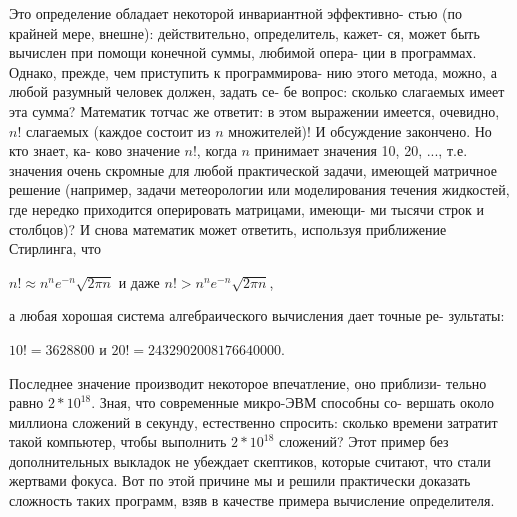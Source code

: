 Это определение  обладает  некоторой  инвариантной  эффективно-\linebreak
стью (по крайней мере, внешне): действительно, определитель, кажет-\linebreak
ся, может быть вычислен при помощи конечной суммы, любимой опера-\linebreak
ции в программах. Однако, прежде, чем приступить к программирова-\linebreak
нию этого метода, можно, а любой разумный человек должен, задать се-\linebreak
бе вопрос: сколько слагаемых имеет эта сумма? Математик тотчас же\linebreak
\newpage
\noindent
ответит: в этом выражении имеется, очевидно, $n!$ слагаемых (каждое\linebreak
состоит из $n$ множителей)! И обсуждение закончено. Но кто знает, ка-\linebreak
ково значение $n!$, когда $n$ принимает значения  10, 20, ..., т.е. значения\linebreak
очень скромные для любой  практической задачи,  имеющей матричное\linebreak
решение  (например,  задачи  метеорологии  или  моделирования течения\linebreak
жидкостей, где нередко приходится оперировать матрицами, имеющи-\linebreak
ми  тысячи  строк  и  столбцов)?  И  снова  математик  может  ответить,\linebreak
используя приближение Стирлинга, что
\begin{center}
$n!\approx n^ne^{-n}\sqrt{2\pi n}$ и даже $n!>n^ne^{-n}\sqrt{2\pi n}$,
\end{center}
а любая хорошая система алгебраического вычисления дает точные ре-\linebreak
зультаты:
\begin{center}
$10!=3 628 800$ и $20!=2 432 902 008 176 640 000$.
\end{center}
Последнее значение производит некоторое впечатление, оно приблизи­-\linebreak
тельно равно $2*10^{18}$. Зная, что современные микро-ЭВМ способны со-\linebreak
вершать  около  миллиона  сложений  в  секунду,  естественно  спросить:\linebreak
сколько времени затратит такой компьютер, чтобы выполнить $2*10^{18}$\linebreak
сложений?\newline
\hspace*{15pt}Этот пример без дополнительных выкладок не убеждает скептиков,\linebreak
которые считают,  что  стали  жертвами  фокуса.  Вот  по этой  причине\linebreak
мы и решили практически доказать сложность таких программ, взяв в\linebreak
качестве примера вычисление определителя.
